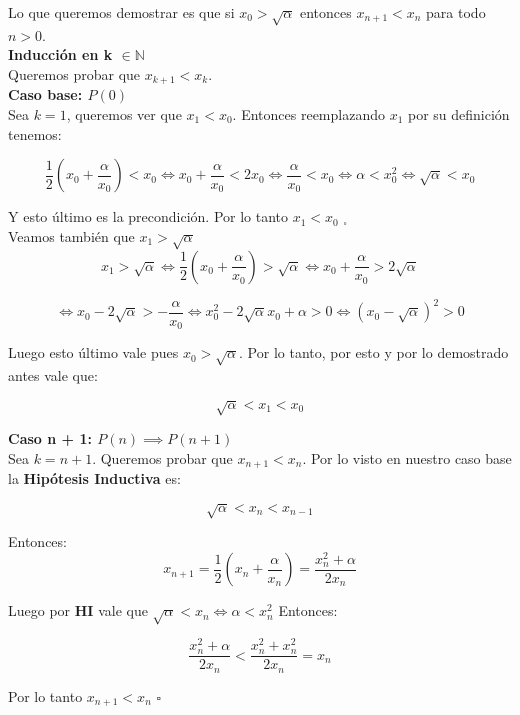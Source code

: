 Lo que queremos demostrar es que si $x_0 > \sqrt{\alpha}$ entonces $x_{n + 1} < x_n$ para todo $n > 0$.\\

{\large \bf Inducción en k $\in \mathbb{N}$}\\
Queremos probar que $x_{k + 1} < x_k$.\\

{\bf Caso base: $P(0)$}\\
Sea $k = 1$, queremos ver que $x_1 < x_0$. Entonces reemplazando $x_1$ por su definición tenemos:

\begin{displaymath}
    \frac{1}{2}(x_0 + \frac{\alpha}{x_0}) < x_0 \iff x_0 + \frac{\alpha}{x_0} < 2x_0 \iff \frac{\alpha}{x_0} < x_0 \iff \alpha < x_0^2 \iff \sqrt{\alpha} < x_0
\end{displaymath}

Y esto último es la precondición. Por lo tanto $x_1 < x_0$ $_\square$\\

Veamos también que $x_1 > \sqrt{\alpha}$\\

\begin{displaymath}
    x_1 > \sqrt{\alpha} \iff \frac{1}{2}(x_0 + \frac{\alpha}{x_0}) > \sqrt{\alpha} \iff x_0 + \frac{\alpha}{x_0} > 2\sqrt{\alpha}
\end{displaymath}

\begin{displaymath}
    \iff x_0 - 2\sqrt{\alpha} > -\frac{\alpha}{x_0} \iff x_0^2 - 2\sqrt{\alpha}x_0 + \alpha > 0 \iff (x_0 - \sqrt{\alpha})^2 > 0
\end{displaymath}

Luego esto último vale pues $x_0 > \sqrt{\alpha}$. Por lo tanto, por esto y por lo demostrado antes vale que:

\begin{displaymath}
    \sqrt{\alpha} < x_1 < x_0
\end{displaymath}

{\bf Caso n + 1: $P(n) \implies P(n + 1)$}\\
Sea $k = n + 1$. Queremos probar que $x_{n + 1} < x_n$. Por lo visto en nuestro caso base la {\bf Hipótesis Inductiva} es:

\begin{displaymath}
    \sqrt{\alpha} < x_n < x_{n - 1}
\end{displaymath}

Entonces:
\begin{displaymath}
    x_{n + 1} = \frac{1}{2}(x_n + \frac{\alpha}{x_n}) = \frac{x_n^2 + \alpha}{2x_n}
\end{displaymath}

Luego por {\bf HI} vale que $\sqrt{\alpha} < x_n \iff \alpha < x_n^2 $ Entonces:

\begin{displaymath}
    \frac{x_n^2 + \alpha}{2x_n} < \frac{x_n^2 + x_n^2}{2x_n} = x_n
\end{displaymath}

Por lo tanto $x_{n + 1} < x_n$ $\square$
